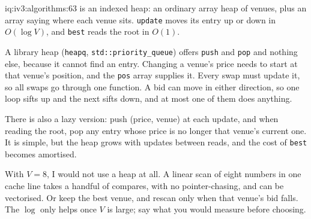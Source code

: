\begin{solution}{iq:iv3:algorithms:63}
 is an indexed heap: an ordinary array heap of venues, plus an array saying where each venue sits. \texttt{update} moves its entry up or down in $O(\log V)$, and \texttt{best} reads the root in $O(1)$.
\label{lst:iv3:al:bestvenue}

A library heap (\texttt{heapq}, \texttt{std::priority\_queue}) offers \texttt{push} and \texttt{pop} and nothing else, because it cannot find an entry. Changing a venue's price needs to start at that venue's position, and the \texttt{pos} array supplies it. Every swap must update it, so all swaps go through one function. A bid can move in either direction, so one loop sifts up and the next sifts down, and at most one of them does anything.

There is also a lazy version: push (price, venue) at each update, and when reading the root, pop any entry whose price is no longer that venue's current one. It is simple, but the heap grows with updates between reads, and the cost of \texttt{best} becomes amortised.

With $V = 8$, I would not use a heap at all. A linear scan of eight numbers in one cache line takes a handful of compares, with no pointer-chasing, and can be vectorised. Or keep the best venue, and rescan only when that venue's bid falls. The $\log$ only helps once $V$ is large; say what you would measure before choosing.

\end{solution}

